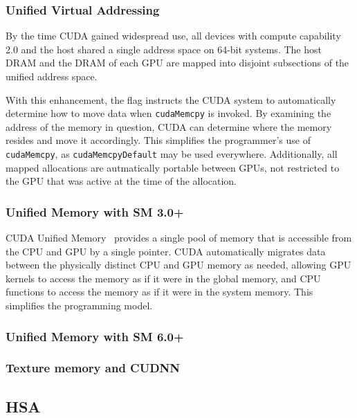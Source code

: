 \subsubsection{Unified Virtual Addressing}

By the time CUDA gained widespread use, all devices with compute capability 2.0 and the host shared a single address space on 64-bit systems.
The host DRAM and the DRAM of each GPU are mapped into disjoint subsections of the unified address space.

With this enhancement, the  flag instructs the CUDA system to automatically determine how to move data when \texttt{cudaMemcpy} is invoked.
By examining the address of the memory in question, CUDA can determine where the memory resides and move it accordingly.
This simplifies the programmer's use of \texttt{cudaMemcpy}, as \texttt{cudaMemcpyDefault} may be used everywhere.
Additionally, all mapped allocations are autmatically portable between GPUs, not restricted to the GPU that was active at the time of the allocation.

\subsubsection{Unified Memory with SM 3.0+}

CUDA Unified Memory~\cite{harris2013cudaunifiedmemory} provides a single pool of memory that is accessible from the CPU and GPU by a single pointer.
CUDA automatically migrates data between the physically distinct CPU and GPU memory as needed, allowing GPU kernels to access the memory as if it were in the global memory, and CPU functions to access the memory as if it were in the system memory.
This simplifies the programming model.

\subsubsection{Unified Memory with SM 6.0+}




\subsubsection{Texture memory and CUDNN}

\subsection{HSA}
\label{sec:hsa}


